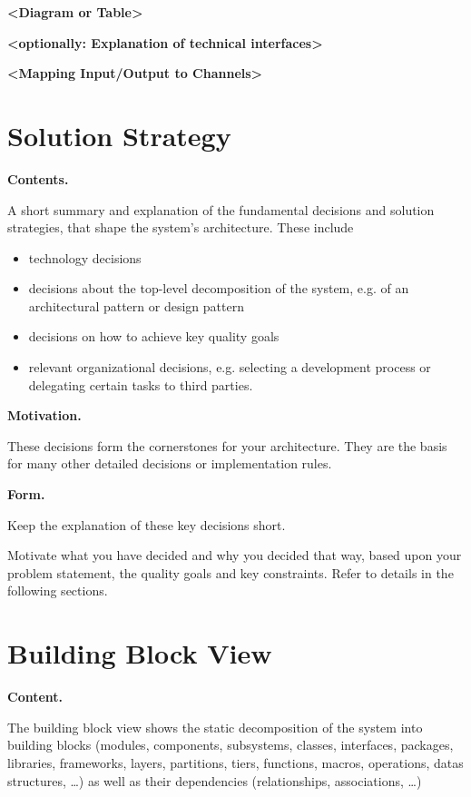 \documentclass[]{article}
\begin{document}
\textbf{\textless{}Diagram or Table\textgreater{}}

\textbf{\textless{}optionally: Explanation of technical
interfaces\textgreater{}}

\textbf{\textless{}Mapping Input/Output to Channels\textgreater{}}

\hypertarget{section-solution-strategy}{%
\section{Solution Strategy}\label{section-solution-strategy}}

\textbf{Contents.}

A short summary and explanation of the fundamental decisions and
solution strategies, that shape the system's architecture. These include

\begin{itemize}
\item
  technology decisions
\item
  decisions about the top-level decomposition of the system, e.g. 
  of an architectural pattern or design pattern
\item
  decisions on how to achieve key quality goals
\item
  relevant organizational decisions, e.g. selecting a development
  process or delegating certain tasks to third parties.
\end{itemize}

\textbf{Motivation.}

These decisions form the cornerstones for your architecture. They are
the basis for many other detailed decisions or implementation rules.

\textbf{Form.}

Keep the explanation of these key decisions short.

Motivate what you have decided and why you decided that way, based upon
your problem statement, the quality goals and key constraints. Refer to
details in the following sections.

\hypertarget{section-building-block-view}{%
\section{Building Block View}\label{section-building-block-view}}

\textbf{Content.}

The building block view shows the static decomposition of the system
into building blocks (modules, components, subsystems, classes,
interfaces, packages, libraries, frameworks, layers, partitions, tiers,
functions, macros, operations, datas structures, \ldots{}) as well as
their dependencies (relationships, associations, \ldots{})
\end{document}
